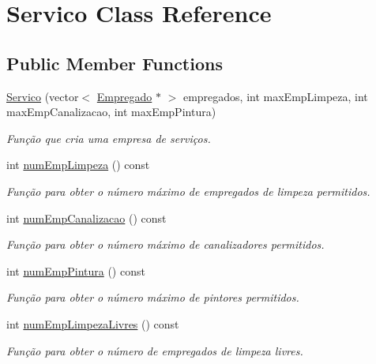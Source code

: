 \hypertarget{class_servico}{}\section{Servico Class Reference}
\label{class_servico}
\subsection*{Public Member Functions}
\begin{DoxyCompactItemize}
\item 
\hyperlink{class_servico_a920dbd3231fa6ca3ba9e118764bb7d4b}{Servico} (vector$<$ \hyperlink{class_empregado}{Empregado} $\ast$ $>$ empregados, int max\+Emp\+Limpeza, int max\+Emp\+Canalizacao, int max\+Emp\+Pintura)
\begin{DoxyCompactList}\small\item\em Função que cria uma empresa de serviços. \end{DoxyCompactList}\item 
int \hyperlink{class_servico_a590ca90b6563c337eeb55b08255a4894}{num\+Emp\+Limpeza} () const 
\begin{DoxyCompactList}\small\item\em Função para obter o número máximo de empregados de limpeza permitidos. \end{DoxyCompactList}\item 
int \hyperlink{class_servico_a09dedacf7c261a12e86e263510748c74}{num\+Emp\+Canalizacao} () const 
\begin{DoxyCompactList}\small\item\em Função para obter o número máximo de canalizadores permitidos. \end{DoxyCompactList}\item 
int \hyperlink{class_servico_a9e2a6c88d5e6aa250fe4472cd2cec3bf}{num\+Emp\+Pintura} () const 
\begin{DoxyCompactList}\small\item\em Função para obter o número máximo de pintores permitidos. \end{DoxyCompactList}\item 
int \hyperlink{class_servico_a6cd98c383025f6a00a4314caab86a016}{num\+Emp\+Limpeza\+Livres} () const 
\begin{DoxyCompactList}\small\item\em Função para obter o número de empregados de limpeza livres. \end{DoxyCompactList}\item 

\end{DoxyCompactItemize}
